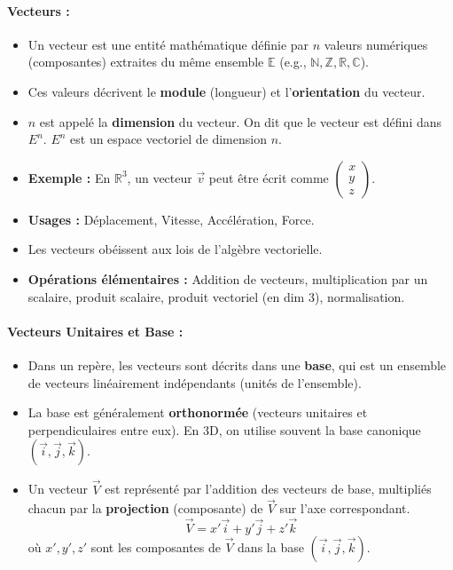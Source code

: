 \documentclass{article}
\begin{document}
\paragraph{Vecteurs :}
\begin{itemize}
    \item Un vecteur est une entité mathématique définie par $n$ valeurs numériques (composantes) extraites du même ensemble $\mathbb{E}$ (e.g., $\mathbb{N}, \mathbb{Z}, \mathbb{R}, \mathbb{C}$).
    \item Ces valeurs décrivent le \textbf{module} (longueur) et l'\textbf{orientation} du vecteur.
    \item $n$ est appelé la \textbf{dimension} du vecteur. On dit que le vecteur est défini dans $E^n$. $E^n$ est un espace vectoriel de dimension $n$.
    \item \textbf{Exemple :} En $\mathbb{R}^3$, un vecteur $\vec{v}$ peut être écrit comme $\begin{pmatrix} x \\ y \\ z \end{pmatrix}$.
    \item \textbf{Usages :} Déplacement, Vitesse, Accélération, Force.
    \item Les vecteurs obéissent aux lois de l'algèbre vectorielle.
    \item \textbf{Opérations élémentaires :} Addition de vecteurs, multiplication par un scalaire, produit scalaire, produit vectoriel (en dim 3), normalisation.
\end{itemize}

\paragraph{Vecteurs Unitaires et Base :}
\begin{itemize}
    \item Dans un repère, les vecteurs sont décrits dans une \textbf{base}, qui est un ensemble de vecteurs linéairement indépendants (unités de l'ensemble).
    \item La base est généralement \textbf{orthonormée} (vecteurs unitaires et perpendiculaires entre eux). En 3D, on utilise souvent la base canonique $(\vec{i}, \vec{j}, \vec{k})$.
    \item Un vecteur $\vec{V}$ est représenté par l'addition des vecteurs de base, multipliés chacun par la \textbf{projection} (composante) de $\vec{V}$ sur l'axe correspondant.
    \[ \vec{V} = x'\vec{i} + y'\vec{j} + z'\vec{k} \]
    où $x', y', z'$ sont les composantes de $\vec{V}$ dans la base $(\vec{i}, \vec{j}, \vec{k})$.
\end{itemize}
\end{document}
